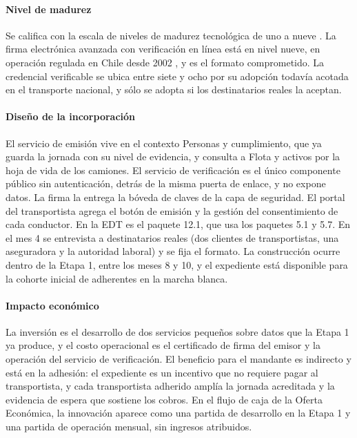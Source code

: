 \paragraph{Nivel de madurez} Se califica con la escala de niveles de madurez tecnológica de uno a nueve
\parencite{iso16290}. La firma electrónica avanzada con verificación en línea está en nivel nueve, en
operación regulada en Chile desde 2002 \parencite{ley19799}, y es el formato comprometido. La
credencial verificable se ubica entre siete y ocho por su adopción todavía acotada en el transporte
nacional, y sólo se adopta si los destinatarios reales la aceptan.

\paragraph{Diseño de la incorporación} El servicio de emisión vive en el contexto Personas y
cumplimiento, que ya guarda la jornada con su nivel de evidencia, y consulta a Flota y activos por la
hoja de vida de los camiones. El servicio de verificación es el único componente público sin
autenticación, detrás de la misma puerta de enlace, y no expone datos. La firma la entrega la bóveda de
claves de la capa de seguridad. El portal del transportista agrega el botón de emisión y la gestión del
consentimiento de cada conductor. En la EDT es el paquete 12.1, que usa los paquetes 5.1 y 5.7. En el
mes 4 se entrevista a destinatarios reales (dos clientes de transportistas, una aseguradora y la
autoridad laboral) y se fija el formato. La construcción ocurre dentro de la Etapa 1, entre los meses 8
y 10, y el expediente está disponible para la cohorte inicial de adherentes en la marcha blanca.

\paragraph{Impacto económico} La inversión es el desarrollo de dos servicios pequeños sobre datos que la
Etapa 1 ya produce, y el costo operacional es el certificado de firma del emisor y la operación del
servicio de verificación. El beneficio para el mandante es indirecto y está en la adhesión: el
expediente es un incentivo que no requiere pagar al transportista, y cada transportista adherido amplía
la jornada acreditada y la evidencia de espera que sostiene los cobros. En el flujo de caja de la Oferta
Económica, la innovación aparece como una partida de desarrollo en la Etapa 1 y una partida de
operación mensual, sin ingresos atribuidos.

